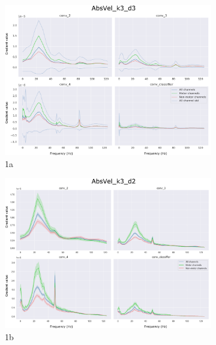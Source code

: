 \begin{figure}
\begin{subfigure}{.5\textwidth}
  \centering
  \includegraphics[width=\linewidth]{img/ch4/absVel-k3-d3}
  \caption{1a}
  \label{fig:sfig1}
\end{subfigure}%
\begin{subfigure}{.5\textwidth}
  \centering
  \includegraphics[width=\linewidth]{img/ch4/absVel-k3-d2}
  \caption{1b}
  \label{fig:sfig2}
\end{subfigure}
\begin{subfigure}{.5\textwidth}
  \centering

\end{subfigure}
\end{figure}
